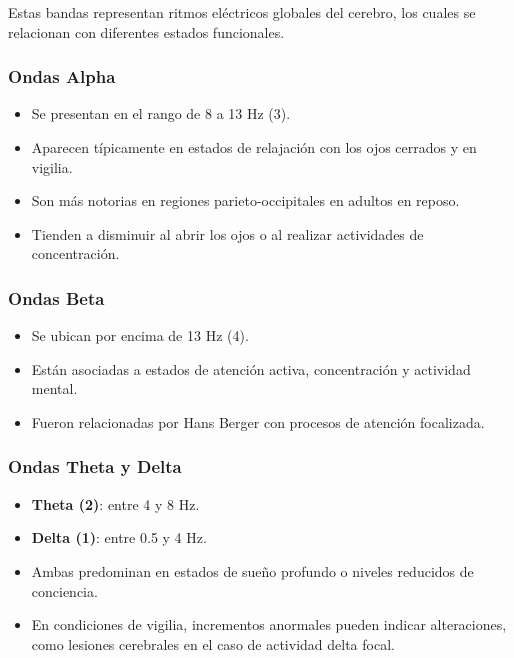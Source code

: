 \documentclass[12pt,letterpaper]{article}
\begin{document}
Estas bandas representan ritmos eléctricos globales del cerebro, los cuales se relacionan con diferentes estados funcionales.\cite{nunez_electroencephalography_2017}

\subsubsection{Ondas Alpha}

\begin{itemize}
    \item Se presentan en el rango de 8 a 13 Hz (3).
    \item Aparecen típicamente en estados de relajación con los ojos cerrados y en vigilia.
    \item Son más notorias en regiones parieto-occipitales en adultos en reposo.
    \item Tienden a disminuir al abrir los ojos o al realizar actividades de concentración.
\end{itemize}
\cite{nunez_electroencephalography_2017}
\subsubsection{Ondas Beta}

\begin{itemize}
    \item Se ubican por encima de 13 Hz (4).
    \item Están asociadas a estados de atención activa, concentración y actividad mental.
    \item Fueron relacionadas por Hans Berger con procesos de atención focalizada.
\end{itemize}

\subsubsection{Ondas Theta y Delta}

\begin{itemize}
    \item \textbf{Theta (2)}: entre 4 y 8 Hz.
    \item \textbf{Delta (1)}: entre 0.5 y 4 Hz.
    \item Ambas predominan en estados de sueño profundo o niveles reducidos de conciencia.
    \item En condiciones de vigilia, incrementos anormales pueden indicar alteraciones, como lesiones cerebrales en el caso de actividad delta focal.
\end{itemize}
\cite{kropotov_slow_2009}
\end{document}
